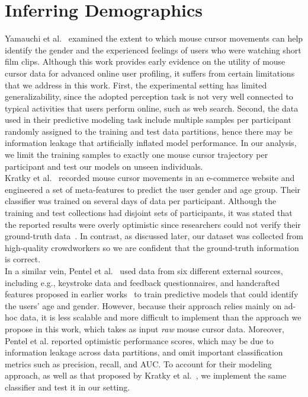 \documentclass[11pt,oneside,a4paper,openright]{book}
\begin{document}
\section{Inferring Demographics}
\label{sec:demographic_attributes}

Yamauchi et al.~\cite{Yamauchi2014} examined the extent to which mouse cursor movements can help identify the gender
and the experienced feelings of users who were watching short film clips.
Although this work provides early evidence on the utility of mouse cursor data for advanced online user profiling,
it suffers from certain limitations that we address in this work.
First, the experimental setting has limited generalizability,
since the adopted perception task is not very well connected
to typical activities that users perform online, such as web search.
Second, the data used in their predictive modeling task include multiple samples per participant
randomly assigned to the training and test data partitions,
hence there may be information leakage that artificially inflated model performance.
In our analysis, we limit the training samples to exactly one mouse cursor trajectory per participant
and test our models on unseen individuals.\\

Kratky et al.~\cite{Kratky16_demographics} recorded mouse cursor movements in an e-commerce website
and engineered a set of meta-features to predict the user gender and age group.
Their classifier was trained on several days of data per participant.
Although the training and test collections had disjoint sets of participants,
it was stated that the reported results were overly optimistic
since researchers could not verify their ground-truth data~\cite{Kratky16_demographics}.
In contrast, as discussed later,
our dataset was collected from high-quality crowdworkers
so we are confident that the ground-truth information is correct.\\

In a similar vein, Pentel et al.~\cite{Pentel2017} used data from six different external sources,
including e.g., keystroke data and feedback questionnaires,
and handcrafted features proposed in earlier works~\cite{Claypool01_iii, Diriye12_leaving, Shapira06_ii}
to train predictive models that could identify the users' age and gender.
However, because their approach relies mainly on ad-hoc data,
it is less scalable and more difficult to implement than the approach we propose in this work,
which takes as input \emph{raw} mouse cursor data.
Moreover, Pentel et al. reported optimistic performance scores,
which may be due to information leakage across data partitions,
and omit important classification metrics such as precision, recall, and AUC.
To account for their modeling approach, as well as that proposed by Kratky et al.~\cite{Kratky16_demographics},
we implement the same classifier and test it in our setting.
\end{document}
